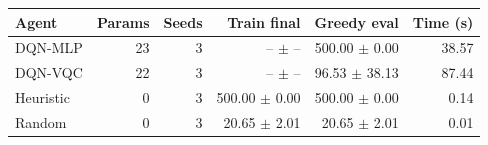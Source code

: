 \begin{tabular}{lrrrrr}
\hline
Agent & Params & Seeds & Train final & Greedy eval & Time (s) \\
\hline
DQN-MLP & 23 & 3 & -- $\pm$ -- & 500.00 $\pm$ 0.00 & 38.57 \\
DQN-VQC & 22 & 3 & -- $\pm$ -- & 96.53 $\pm$ 38.13 & 87.44 \\
Heuristic & 0 & 3 & 500.00 $\pm$ 0.00 & 500.00 $\pm$ 0.00 & 0.14 \\
Random & 0 & 3 & 20.65 $\pm$ 2.01 & 20.65 $\pm$ 2.01 & 0.01 \\
\hline
\end{tabular}

